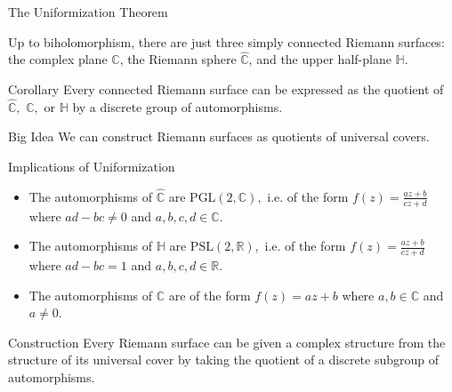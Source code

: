 \documentclass{beamer}
\begin{document}
\begin{frame}{The Uniformization Theorem}
\begin{theorem}
   Up to biholomorphism, there are just three simply connected Riemann surfaces: the complex plane $\mathbb{C}$, the Riemann sphere $\hat{\mathbb{C}}$, and the upper half-plane $\mathbb{H}$.
\end{theorem}
\begin{block}{Corollary}
Every connected Riemann surface can be expressed as the quotient of $\hat{\mathbb{C}},$ $\mathbb{C},$ or $\mathbb{H}$ by a discrete group of automorphisms.
\end{block}
\begin{block}{Big Idea}
    We can construct Riemann surfaces as quotients of universal covers.
\end{block}
\end{frame}
\begin{frame}{Implications of Uniformization}

\begin{theorem}
\begin{itemize}
    \item The automorphisms of $\hat{\mathbb{C}}$ are $\text{PGL}(2, \mathbb{C}),$ i.e. of the form $f(z)=\frac{az+b}{cz+d}$ where $ad-bc\ne 0$ and $a, b, c, d\in \mathbb{C}.$
    \item The automorphisms of $\mathbb{H}$ are $\text{PSL}(2, \mathbb{R}),$ i.e. of the form $f(z)=\frac{az+b}{cz+d}$ where $ad-bc=1$ and $a, b, c, d\in \mathbb{R}.$
    \item The automorphisms of $\mathbb{C}$ are of the form $f(z)=az+b$ where $a, b\in \mathbb{C}$ and $a\ne 0.$
\end{itemize}
\end{theorem}
\begin{block}{Construction}
Every Riemann surface can be given a complex structure from the structure of its universal cover by taking the quotient of a discrete subgroup of automorphisms.
\end{block}
\end{frame}
\end{document}
